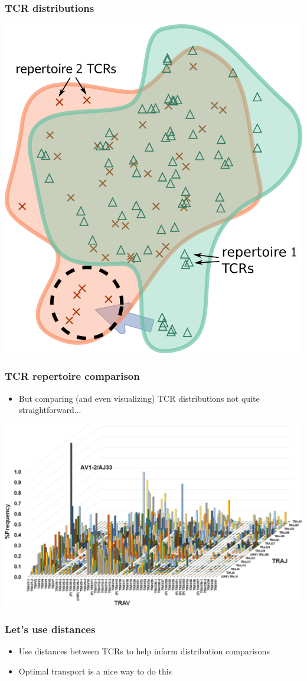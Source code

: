\documentclass[mathserif,compress,xcolor={dvipsnames}]{beamer}
\renewcommand\;{\,}
\begin{document}
\begin{frame}\frametitle{TCR distributions}
\begin{center}
\includegraphics[width=0.6\linewidth]{Images/transport-cartoon.png}
\end{center}
\end{frame}

\begin{frame}\frametitle{TCR repertoire comparison}
\begin{itemize}
\bigskip
\item
But comparing (and even visualizing) TCR distributions not quite straightforward...
\end{itemize}
\begin{center}
\includegraphics[width=0.8\linewidth]{Images/TCRRepertoire.png}
\end{center}
\end{frame}

\begin{frame}\frametitle{Let's use distances}
\begin{itemize}
\item
Use distances between TCRs to help inform distribution comparisons
\bigskip
\item
Optimal transport is a nice way to do this
\end{itemize}
\end{frame}
\end{document}
